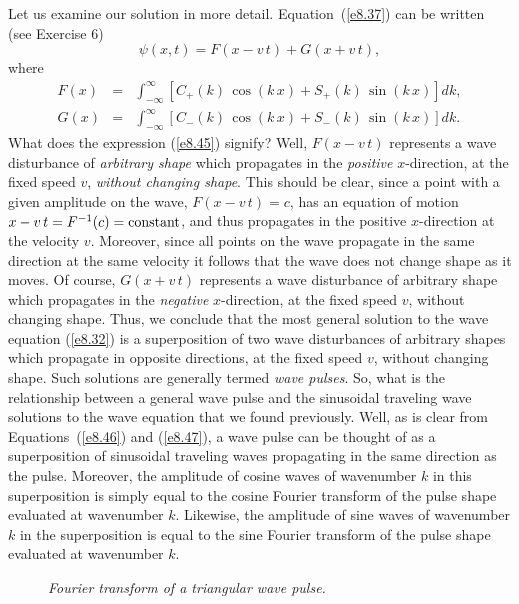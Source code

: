 Let us examine our solution in more detail. Equation~(\ref{e8.37}) can be
written (see Exercise 6)
\begin{equation}\label{e8.45}
\psi(x,t) = F(x-v\,t)+ G(x+v\,t),
\end{equation}
where 
\begin{eqnarray}\label{e8.46}
F(x) &=& \int_{-\infty}^\infty\left[C_+(k)\,\cos(k\,x)+ S_+(k)\,\sin(k\,x)\right] dk,\\[0.5ex]
G(x) &=& \int_{-\infty}^\infty\left[C_-(k)\,\cos(k\,x)+ S_-(k)\,\sin(k\,x)\right] dk.\label{e8.47}
\end{eqnarray}
What does the expression (\ref{e8.45}) signify? Well, $F(x-v\,t)$ represents a wave disturbance  of {\em arbitrary
shape}\/ which propagates in the {\em positive}\/ $x$-direction, at the fixed speed $v$,   {\em without changing shape}. This should be clear, since a  point with a given amplitude on the
wave, $F(x-v\,t)=c$, has an equation of motion $x-v\,t=F^{-1}(c)={\rm constant}$, and thus
propagates in the positive $x$-direction at the  velocity $v$. Moreover,
since all points on the wave propagate in the same direction at the same velocity
it follows that the wave does not change shape as it moves. Of course,
$G(x+v\,t)$ represents a wave disturbance of arbitrary shape which propagates in the
{\em negative}\/ $x$-direction, at the fixed speed $v$, without changing shape. Thus,
we conclude that the most general solution to the wave equation  (\ref{e8.32}) is
a superposition of two wave disturbances of arbitrary shapes which propagate
in opposite directions, at the fixed speed $v$, without changing shape. Such
solutions are generally termed {\em wave pulses}. So, what is the relationship
between a general wave pulse and the sinusoidal traveling wave solutions to the
wave equation that we found previously. Well, as is clear from Equations~(\ref{e8.46}) and (\ref{e8.47}), a wave pulse can be thought of as a superposition of sinusoidal
traveling waves propagating in the same direction as the pulse. Moreover, the amplitude of cosine
waves of wavenumber $k$ in this superposition is simply equal to the cosine Fourier
transform of the pulse shape evaluated at wavenumber $k$. Likewise,
the amplitude of sine waves of wavenumber $k$ in the superposition is equal to the sine Fourier
transform of the pulse shape evaluated at wavenumber $k$.

\begin{figure}
\epsfysize=2.2in
\centerline{}
\caption{\em Fourier transform of a triangular wave pulse.}\label{f8.3}   
\end{figure}

